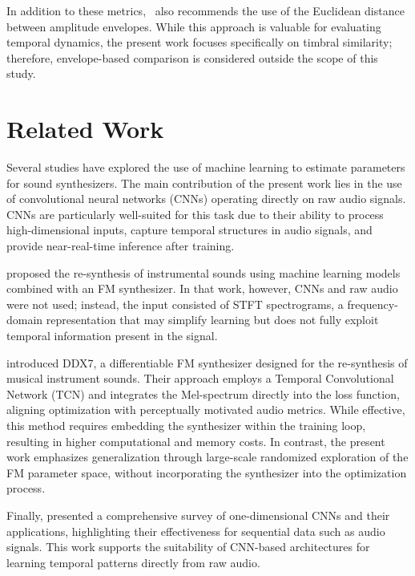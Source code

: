 \documentclass[10pt,conference]{IEEEtran}
\begin{document}
In addition to these metrics,~\cite{claesson2021resynthesis} also recommends the use of the Euclidean distance between amplitude envelopes. While this approach is valuable for evaluating temporal dynamics, the present work focuses specifically on timbral similarity; therefore, envelope-based comparison is considered outside the scope of this study.

\section{Related Work} \label{sec:related}

Several studies have explored the use of machine learning to estimate parameters for sound synthesizers. The main contribution of the present work lies in the use of convolutional neural networks (CNNs) operating directly on raw audio signals. CNNs are particularly well-suited for this task due to their ability to process high-dimensional inputs, capture temporal structures in audio signals, and provide near-real-time inference after training.

\cite{claesson2021resynthesis} proposed the re-synthesis of instrumental sounds using machine learning models combined with an FM synthesizer. In that work, however, CNNs and raw audio were not used; instead, the input consisted of STFT spectrograms, a frequency-domain representation that may simplify learning but does not fully exploit temporal information present in the signal.

\cite{steinmetz2022ddx7} introduced DDX7, a differentiable FM synthesizer designed for the re-synthesis of musical instrument sounds. Their approach employs a Temporal Convolutional Network (TCN) and integrates the Mel-spectrum directly into the loss function, aligning optimization with perceptually motivated audio metrics. While effective, this method requires embedding the synthesizer within the training loop, resulting in higher computational and memory costs. In contrast, the present work emphasizes generalization through large-scale randomized exploration of the FM parameter space, without incorporating the synthesizer into the optimization process.

Finally, \cite{kiranyaz2021survey} presented a comprehensive survey of one-dimensional CNNs and their applications, highlighting their effectiveness for sequential data such as audio signals. This work supports the suitability of CNN-based architectures for learning temporal patterns directly from raw audio.
\end{document}
